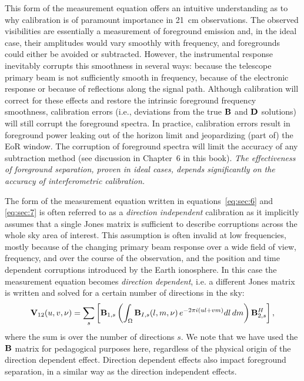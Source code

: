This form of the measurement equation offers an intuitive understanding as to why calibration is of paramount importance in 21~cm observations. The observed visibilities are essentially a measurement of foreground emission and, in the ideal case, their amplitudes would vary smoothly with frequency, and foregrounds could either be avoided or subtracted. However, the instrumental response inevitably corrupts this smoothness in several ways: because the telescope primary beam is not sufficiently smooth in frequency, because of the electronic response or because of reflections along the signal path. Although calibration will correct for these effects and restore the intrinsic foreground frequency smoothness, calibration errors (i.e., deviations from the true ${\bf B}$ and ${\bf D}$ solutions) will still corrupt the foreground spectra. In practice, calibration errors result in foreground power leaking out of the horizon limit and jeopardizing (part of) the EoR window. The corruption of foreground spectra will limit the accuracy of any subtraction method (see discussion in Chapter~6 in this book). {\it The effectiveness of foreground separation, proven in ideal cases, depends significantly on the accuracy of interferometric calibration.}

The form of the measurement equation written in equations~\ref{eq:sec:6} and \ref{eq:sec:7} is often referred to as a {\it direction independent} calibration as it implicitly assumes that a single Jones matrix is sufficient to describe corruptions across the whole sky area of interest. This assumption is often invalid at low frequencies, mostly because of the changing primary beam response over a wide field of view, frequency, and over the course of the observation, and the position and time dependent corruptions introduced by the Earth ionosphere. In this case the measurement equation becomes {\it direction dependent}, i.e. a different Jones matrix is written and solved for a certain number of directions in the sky:
\begin{equation}
{\bf V}_{12} (u,v,\nu) = \sum_s \left[ {\bf B}_{1,s} \left( \int_\Omega {\bf B}_{I,s} (l, m, \nu) \, e^{-2 \pi i (ul + vm)} dl \, dm  \right) {\bf B}_{2,s}^H \right],
\label{eq:sec:7_added}
\end{equation}
where the sum is over the number of directions $s$. We note that we have used the ${\bf B}$ matrix for pedagogical purposes here, regardless of the physical origin of the direction dependent effect. Direction dependent effects also impact foreground separation, in a similar way as the direction independent effects.
 
